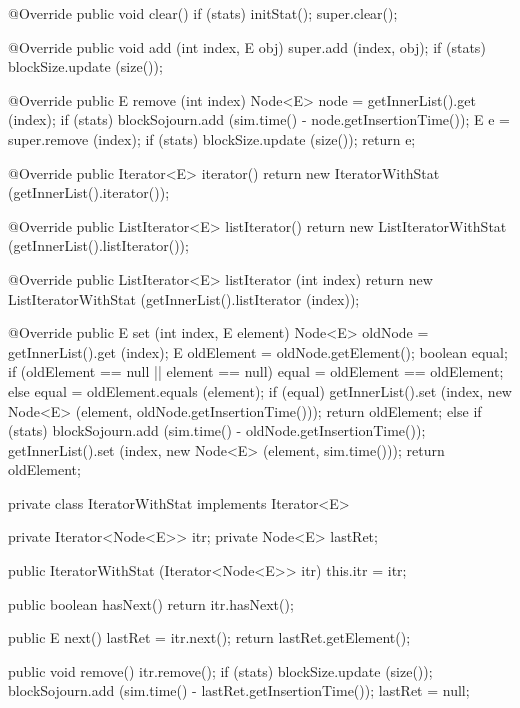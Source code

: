 \begin{code}\begin{hide}

   @Override
   public void clear() {
      if (stats)
         initStat();
      super.clear();
   }

   @Override
   public void add (int index, E obj)  {
      super.add (index, obj);
      if (stats)
         blockSize.update (size());
   }

   @Override
   public E remove (int index) {
      Node<E> node = getInnerList().get (index);
      if (stats)
         blockSojourn.add (sim.time() - node.getInsertionTime());
      E e = super.remove (index);
      if (stats)
         blockSize.update (size());
      return e;
   }

   @Override
   public Iterator<E> iterator() {
      return new IteratorWithStat (getInnerList().iterator());
   }

   @Override
   public ListIterator<E> listIterator() {
      return new ListIteratorWithStat (getInnerList().listIterator());
   }

   @Override
   public ListIterator<E> listIterator (int index) {
      return new ListIteratorWithStat (getInnerList().listIterator (index));
   }

   @Override
   public E set (int index, E element) {
      Node<E> oldNode = getInnerList().get (index);
      E oldElement = oldNode.getElement();
      boolean equal;
      if (oldElement == null || element == null)
         equal = oldElement == oldElement;
      else
         equal = oldElement.equals (element);
      if (equal) {
         getInnerList().set (index, new Node<E> (element, oldNode.getInsertionTime()));
         return oldElement;
      }
      else {
         if (stats)
            blockSojourn.add (sim.time() - oldNode.getInsertionTime());
         getInnerList().set (index, new Node<E> (element, sim.time()));
         return oldElement;
      }
   }

   private class IteratorWithStat implements Iterator<E> {
      private Iterator<Node<E>> itr;
      private Node<E> lastRet;

      public IteratorWithStat (Iterator<Node<E>> itr) {
         this.itr = itr;
      }

      public boolean hasNext() {
         return itr.hasNext();
      }

      public E next() {
         lastRet = itr.next();
         return lastRet.getElement();
      }

      public void remove() {
         itr.remove();
         if (stats) {
            blockSize.update (size());
            blockSojourn.add (sim.time() - lastRet.getInsertionTime());
         }
         lastRet = null;
      }
   }


\end{hide}
\end{code}
